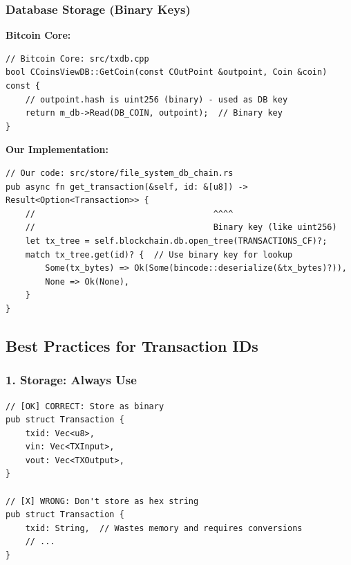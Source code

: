 \needspace{3in}
\subsubsection{Database Storage (Binary Keys)}
\label{sec:ch06-database-keys}

\textbf{Bitcoin Core:}

\begin{listing}[H]
\caption{Bitcoin Core database operations (C++)}
\label{lst:ch06-18}
\begin{verbatim}
// Bitcoin Core: src/txdb.cpp
bool CCoinsViewDB::GetCoin(const COutPoint &outpoint, Coin &coin) const {
    // outpoint.hash is uint256 (binary) - used as DB key
    return m_db->Read(DB_COIN, outpoint);  // Binary key
}
\end{verbatim}
\end{listing}

\needspace{3in}
\textbf{Our Implementation:}

\begin{listing}[H]
\caption{Our database operations}
\label{lst:ch06-19}
\begin{verbatim}
// Our code: src/store/file_system_db_chain.rs
pub async fn get_transaction(&self, id: &[u8]) -> Result<Option<Transaction>> {
    //                                    ^^^^
    //                                    Binary key (like uint256)
    let tx_tree = self.blockchain.db.open_tree(TRANSACTIONS_CF)?;
    match tx_tree.get(id)? {  // Use binary key for lookup
        Some(tx_bytes) => Ok(Some(bincode::deserialize(&tx_bytes)?)),
        None => Ok(None),
    }
}
\end{verbatim}
\end{listing}

\needspace{3in}
\subsection{Best Practices for Transaction IDs}
\label{sec:ch06-full-best-practices}

\subsubsection{1. Storage: Always Use }
\label{sec:ch06-storage-best-practice}

\begin{listing}[H]
\caption{Storage best practices}
\label{lst:ch06-20}
\begin{verbatim}
// [OK] CORRECT: Store as binary
pub struct Transaction {
    txid: Vec<u8>,
    vin: Vec<TXInput>,
    vout: Vec<TXOutput>,
}

// [X] WRONG: Don't store as hex string
pub struct Transaction {
    txid: String,  // Wastes memory and requires conversions
    // ...
}
\end{verbatim}
\end{listing}

